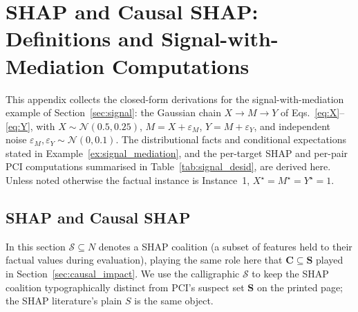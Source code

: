 \section{SHAP and Causal SHAP: Definitions and Signal-with-Mediation Computations}\label{app:signal}

This appendix collects the closed-form derivations for the
signal-with-mediation example of Section~\ref{sec:signal}: the Gaussian chain
$X\to M\to Y$ of Eqs.~\eqref{eq:X}--\eqref{eq:Y}, with
$X\sim\mathcal{N}(0.5,0.25)$, $M=X+\varepsilon_M$, $Y=M+\varepsilon_Y$, and
independent noise $\varepsilon_M,\varepsilon_Y\sim\mathcal{N}(0,0.1)$. The
distributional facts and conditional expectations stated in
Example~\ref{ex:signal_mediation}, and the per-target SHAP and per-pair PCI
computations summarised in Table~\ref{tab:signal_desid}, are derived here.
Unless noted otherwise the factual instance is Instance~1,
$X^\star=M^\star=Y^\star=1$.

\subsection{SHAP and Causal SHAP}\label{sec:shap_defs}

In this section $\mathcal{S} \subseteq N$ denotes a SHAP coalition (a subset of features held
to their factual values during evaluation), playing the same role here that
$\mathbf{C} \subseteq \mathbf{S}$ played in Section~\ref{sec:causal_impact}. We use the
calligraphic $\mathcal{S}$ to keep the SHAP coalition typographically distinct from PCI's
suspect set $\mathbf{S}$ on the printed page; the SHAP literature's plain $S$ is the same
object.

